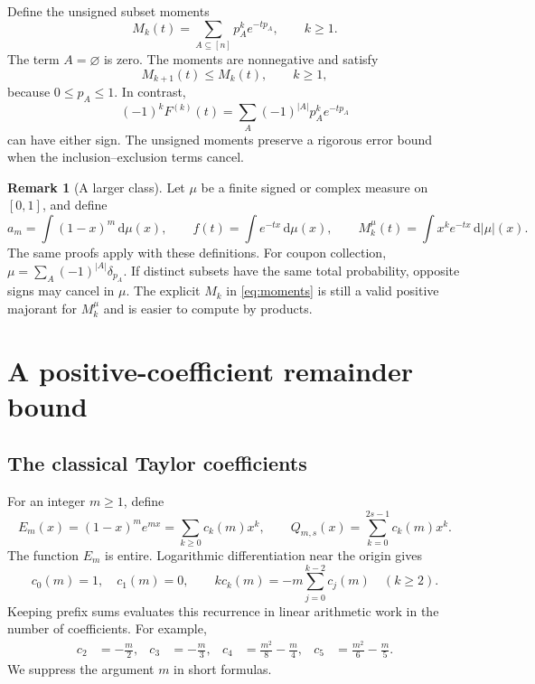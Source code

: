 \documentclass[11pt,a4paper]{article}
\theoremstyle{definition}
\newtheorem{remark}[theorem]{Remark}
\newcommand{\dd}{\,\mathrm d}
\begin{document}
Define the unsigned subset moments
\begin{equation}\label{eq:moments}
 M_k(t)=\sum_{A\subseteq[n]}p_A^k e^{-tp_A},\qquad k\ge1.
\end{equation}
The term $A=\varnothing$ is zero. The moments are nonnegative and satisfy
\begin{equation}\label{eq:momentmonotone}
 M_{k+1}(t)\le M_k(t),\qquad k\ge1,
\end{equation}
because $0\le p_A\le1$. In contrast,
\begin{equation}\label{eq:Fderiv}
 (-1)^kF^{(k)}(t)
   =\sum_A(-1)^{|A|}p_A^k e^{-tp_A}
\end{equation}
can have either sign. The unsigned moments preserve a rigorous error bound
when the inclusion--exclusion terms cancel.

\begin{remark}[A larger class]\label{rem:mixtures}
Let $\mu$ be a finite signed or complex measure on $[0,1]$, and define
\[
 a_m=\int(1-x)^m\dd\mu(x),\qquad
 f(t)=\int e^{-tx}\dd\mu(x),\qquad
 M_k^{\mu}(t)=\int x^k e^{-tx}\dd|\mu|(x).
\]
The same proofs apply with these definitions. For coupon collection,
$\mu=\sum_A(-1)^{|A|}\delta_{p_A}$. If distinct subsets have the same
total probability, opposite signs may cancel in $\mu$. The explicit
$M_k$ in \eqref{eq:moments} is still a valid positive majorant for
$M_k^{\mu}$ and is easier to compute by products.
\end{remark}

\section{A positive-coefficient remainder bound}\label{sec:scalar}

\subsection{The classical Taylor coefficients}

For an integer $m\ge1$, define
\begin{equation}\label{eq:kernel}
 E_m(x)=(1-x)^m e^{mx}=\sum_{k\ge0}c_k(m)x^k,
 \qquad Q_{m,s}(x)=\sum_{k=0}^{2s-1}c_k(m)x^k.
\end{equation}
The function $E_m$ is entire. Logarithmic differentiation near the origin
gives
\begin{equation}\label{eq:crecurrence}
 c_0(m)=1,\quad c_1(m)=0,\qquad
 k c_k(m)=-m\sum_{j=0}^{k-2}c_j(m)\quad(k\ge2).
\end{equation}
Keeping prefix sums evaluates this recurrence in linear arithmetic work
in the number of coefficients. For example,
\begin{align}\label{eq:firstc}
 c_2&=-\frac m2,&c_3&=-\frac m3,&
 c_4&=\frac{m^2}{8}-\frac m4,&
 c_5&=\frac{m^2}{6}-\frac m5.\nonumber
\end{align}
We suppress the argument $m$ in short formulas.
\end{document}
